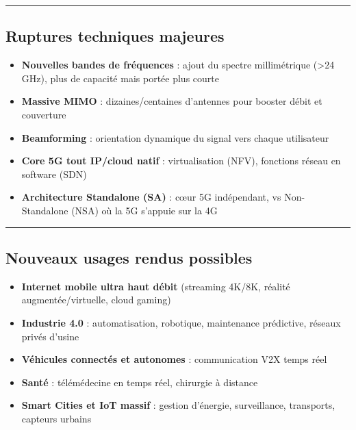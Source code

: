 \documentclass[
  french,
]{article}
\providecommand{\tightlist}{%
  \setlength{\itemsep}{0pt}\setlength{\parskip}{0pt}}
\begin{document}
\begin{center}\rule{0.5\linewidth}{0.5pt}\end{center}

\subsection{Ruptures techniques
majeures}\label{ruptures-techniques-majeures}

\begin{itemize}
\tightlist
\item
  \textbf{Nouvelles bandes de fréquences} : ajout du spectre
  millimétrique (\textgreater24 GHz), plus de capacité mais portée plus
  courte
\item
  \textbf{Massive MIMO} : dizaines/centaines d'antennes pour booster
  débit et couverture
\item
  \textbf{Beamforming} : orientation dynamique du signal vers chaque
  utilisateur
\item
  \textbf{Core 5G tout IP/cloud natif} : virtualisation (NFV), fonctions
  réseau en software (SDN)
\item
  \textbf{Architecture Standalone (SA)} : cœur 5G indépendant, vs
  Non-Standalone (NSA) où la 5G s'appuie sur la 4G
\end{itemize}

\begin{center}\rule{0.5\linewidth}{0.5pt}\end{center}

\subsection{Nouveaux usages rendus
possibles}\label{nouveaux-usages-rendus-possibles}

\begin{itemize}
\tightlist
\item
  \textbf{Internet mobile ultra haut débit} (streaming 4K/8K, réalité
  augmentée/virtuelle, cloud gaming)
\item
  \textbf{Industrie 4.0} : automatisation, robotique, maintenance
  prédictive, réseaux privés d'usine
\item
  \textbf{Véhicules connectés et autonomes} : communication V2X temps
  réel
\item
  \textbf{Santé} : télémédecine en temps réel, chirurgie à distance
\item
  \textbf{Smart Cities et IoT massif} : gestion d'énergie, surveillance,
  transports, capteurs urbains
\end{itemize}
\end{document}
